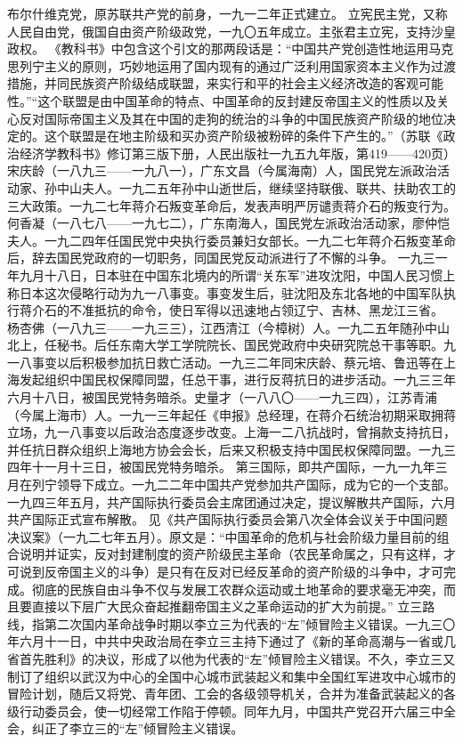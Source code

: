 \begin{maonote}
布尔什维克党，原苏联共产党的前身，一九一二年正式建立。
立宪民主党，又称人民自由党，俄国自由资产阶级政党，一九〇五年成立。主张君主立宪，支持沙皇政权。
《教科书》中包含这个引文的那两段话是：“中国共产党创造性地运用马克思列宁主义的原则，巧妙地运用了国内现有的通过广泛利用国家资本主义作为过渡措施，并同民族资产阶级结成联盟，来实行和平的社会主义经济改造的客观可能性。”“这个联盟是由中国革命的特点、中国革命的反封建反帝国主义的性质以及关心反对国际帝国主义及其在中国的走狗的统治的斗争的中国民族资产阶级的地位决定的。这个联盟是在地主阶级和买办资产阶级被粉碎的条件下产生的。”（苏联《政治经济学教科书》修订第三版下册，人民出版社一九五九年版，第419——420页）
宋庆龄（一八九三——一九八一），广东文昌（今属海南）人，国民党左派政治活动家、孙中山夫人。一九二五年孙中山逝世后，继续坚持联俄、联共、扶助农工的三大政策。一九二七年蒋介石叛变革命后，发表声明严厉谴责蒋介石的叛变行为。何香凝（一八七八——一九七二），广东南海人，国民党左派政治活动家，廖仲恺夫人。一九二四年任国民党中央执行委员兼妇女部长。一九二七年蒋介石叛变革命后，辞去国民党政府的一切职务，同国民党反动派进行了不懈的斗争。
一九三一年九月十八日，日本驻在中国东北境内的所谓“关东军”进攻沈阳，中国人民习惯上称日本这次侵略行动为九一八事变。事变发生后，驻沈阳及东北各地的中国军队执行蒋介石的不准抵抗的命令，使日军得以迅速地占领辽宁、吉林、黑龙江三省。
杨杏佛（一八九三——一九三三），江西清江（今樟树）人。一九二五年随孙中山北上，任秘书。后任东南大学工学院院长、国民党政府中央研究院总干事等职。九一八事变以后积极参加抗日救亡活动。一九三二年同宋庆龄、蔡元培、鲁迅等在上海发起组织中国民权保障同盟，任总干事，进行反蒋抗日的进步活动。一九三三年六月十八日，被国民党特务暗杀。史量才（一八八〇——一九三四），江苏青浦（今属上海市）人。一九一三年起任《申报》总经理，在蒋介石统治初期采取拥蒋立场，九一八事变以后政治态度逐步改变。上海一二八抗战时，曾捐款支持抗日，并任抗日群众组织上海地方协会会长，后来又积极支持中国民权保障同盟。一九三四年十一月十三日，被国民党特务暗杀。
第三国际，即共产国际，一九一九年三月在列宁领导下成立。一九二二年中国共产党参加共产国际，成为它的一个支部。一九四三年五月，共产国际执行委员会主席团通过决定，提议解散共产国际，六月共产国际正式宣布解散。
见《共产国际执行委员会第八次全体会议关于中国问题决议案》（一九二七年五月）。原文是：“中国革命的危机与社会阶级力量目前的组合说明并证实，反对封建制度的资产阶级民主革命（农民革命属之，只有这样，才可说到反帝国主义的斗争）是只有在反对已经反革命的资产阶级的斗争中，才可完成。彻底的民族自由斗争不仅与发展工农群众运动或土地革命的要求毫无冲突，而且要直接以下层广大民众奋起推翻帝国主义之革命运动的扩大为前提。”
立三路线，指第二次国内革命战争时期以李立三为代表的“左”倾冒险主义错误。一九三〇年六月十一日，中共中央政治局在李立三主持下通过了《新的革命高潮与一省或几省首先胜利》的决议，形成了以他为代表的“左”倾冒险主义错误。不久，李立三又制订了组织以武汉为中心的全国中心城市武装起义和集中全国红军进攻中心城市的冒险计划，随后又将党、青年团、工会的各级领导机关，合并为准备武装起义的各级行动委员会，使一切经常工作陷于停顿。同年九月，中国共产党召开六届三中全会，纠正了李立三的“左”倾冒险主义错误。

\end{maonote}
